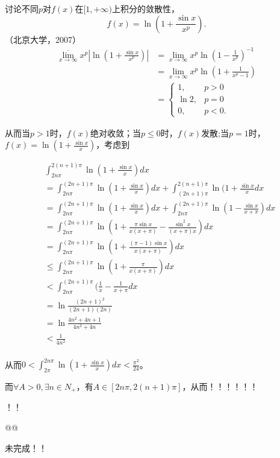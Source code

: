 \begin{example}
讨论不同$p$对$f(x)$在$[1,+\infty)$上积分的敛散性，$$\displaystyle f(x)=\ln(1+\frac{\sin x}{x^p}).$$（北京大学，2007）
  \begin{align*}
  \overline{\lim_{x\rightarrow\infty}}x^p|\ln(1+\frac{\sin x}{x^p})|
  &=\lim_{x\rightarrow\infty}x^p\ln(1-\frac{1}{x^p})^{-1}\\
  &=\lim_{x\rightarrow\infty}x^p\ln(1+\frac{1}{x^p-1})\\
  &=\left\{\begin{array}{ll}1,&p>0\\\ln2,&p=0\\0,&p<0.\end{array}\right.  
  \end{align*}

  从而当$p>1$时，$f(x)$绝对收敛；当$p\leq0$时，$f(x)$发散;当$p=1$时，$f(x)=\ln(1+\frac{\sin x}{x})$，考虑到

  \begin{align*}
  &\int_{2n\pi}^{2(n+1)\pi}\ln(1+\frac{\sin x}{x})dx\\&=\int_{2n\pi}^{(2n+1)\pi}\ln(1+\frac{\sin x}{x})dx+\int_{(2n+1)\pi}^{2(n+1)\pi}\ln(1+\frac{\sin x}{x}dx\\
  &=\int_{2n\pi}^{(2n+1)\pi}\ln(1+\frac{\sin x}{x})dx+\int_{2n\pi}^{(2n+1)\pi}\ln(1-\frac{\sin x}{x+\pi})dx\\
  &=\int_{2n\pi}^{(2n+1)\pi}\ln(1+\frac{\pi\sin x}{x(x+\pi)}-\frac{\sin^2x}{(x+\pi)x})dx\\
  &=\int_{2n\pi}^{(2n+1)\pi}\ln(1+\frac{(\pi-1)\sin x}{x(x+\pi)})dx\\
  &\leq\int_{2n\pi}^{(2n+1)\pi}\ln(1+\frac{\pi}{x(x+\pi)})dx\\
  &<\int_{2n\pi}^{(2n+1)\pi}(\frac{1}{x}-\frac{1}{x+\pi}dx\\
  &=\ln\frac{(2n+1)^2}{(2n+1)(2n)}\\
  &=\ln\frac{4n^2+4n+1}{4n^2+4n}\\
  &<\frac{1}{4n^2}\\
  \end{align*}

  
  从而$0<\int_{2\pi}^{2n\pi}\ln(1+\frac{\sin x}{x})dx<\frac{\pi^2}{24}$。
  
  而$\forall A>0,\exists n\in N_+$，有$A\in[2n\pi,2(n+1)\pi]$，从而！！！！！！
  
  
  
  ！！
  
  @@
  
  未完成！！
    
\end{example}  
    
